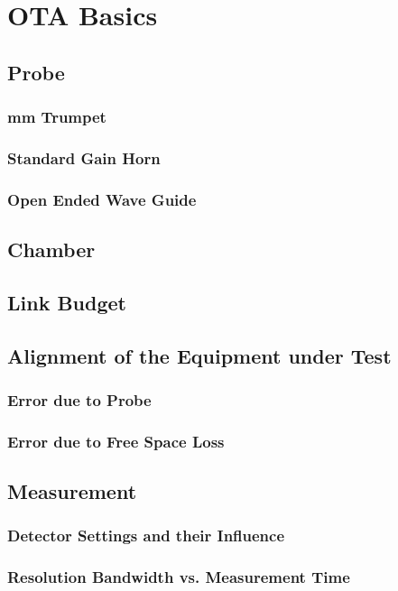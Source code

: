 \chapter{OTA Basics}

\section{Probe}

\subsection{mm Trumpet}

\subsection{Standard Gain Horn}

\subsection{Open Ended Wave Guide}

\section{Chamber}

\section{Link Budget}

\section{Alignment of the Equipment under Test}

\subsection{Error due to Probe}

\subsection{Error due to Free Space Loss}

\section{Measurement}

\subsection{Detector Settings and their Influence}

\subsection{Resolution Bandwidth vs. Measurement Time}

\cite{funsspec}

